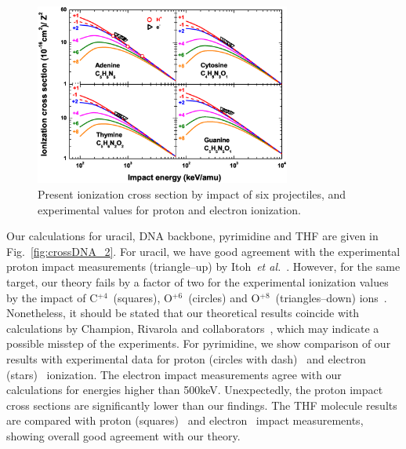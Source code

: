 \documentclass[preprint,12pt]{article}
\begin{document}
\begin{figure}[t!]
\centering
\includegraphics[width=0.75\textwidth]{figuras/Fig_finales/fig2.eps}
\caption{Present ionization cross section by impact of six projectiles, 
and experimental values for proton and electron ionization.}
\label{fig:crossDNA_1}
\end{figure} 

Our calculations for uracil, DNA backbone, pyrimidine and THF are given in 
Fig.~\ref{fig:crossDNA_2}. 
For uracil, we have good agreement with the experimental 
proton impact measurements (triangle--up) by Itoh~{\it et al.}~\cite{itoh2013}. 
However, for the same target, our theory fails by a factor of two for 
the experimental ionization values by the impact of 
C$^{+4}$~(squares), O$^{+6}$~(circles) and O$^{+8}$~(triangles--down) 
ions~\cite{agnihotri2012,agnihotri2013}.
Nonetheless, it should be stated that our theoretical results coincide 
with calculations by Champion, Rivarola and 
collaborators~\cite{champion2012,agnihotri2012}, which may indicate a 
possible misstep of the experiments. 
For pyrimidine, we show comparison of our results with experimental data
for proton (circles with dash)~\cite{wolff2014} and electron
(stars)~\cite{bug2017} ionization. The electron impact measurements 
agree with our calculations for energies higher than 500keV. 
Unexpectedly, the proton impact cross sections are significantly lower 
than our findings. 
The THF molecule results are compared with proton (squares)~\cite{wang2016} 
and electron~\cite{bug2017,wolf2019,fuss2009} impact measurements, showing
overall good agreement with our theory. 
\end{document}
